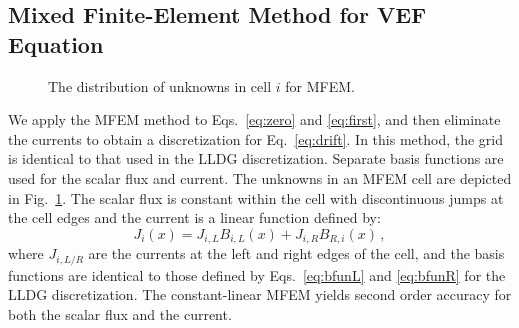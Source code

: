 
\subsection{Mixed Finite-Element Method for VEF Equation}
\begin{figure}
	\centering
	 
	\caption{The distribution of unknowns in cell $i$ for MFEM. }
	\label{fig:mfem_grid}
\end{figure}
We apply the MFEM method to Eqs.~\ref{eq:zero} and \ref{eq:first}, and then eliminate the currents to obtain a discretization for Eq.~\ref{eq:drift}.  In this 
method, the grid is identical to that used in the LLDG \SN discretization.  Separate basis functions are used for the scalar flux and 
current. The unknowns in an MFEM cell are depicted in Fig.~\ref{fig:mfem_grid}. The scalar flux is constant within the cell with discontinuous jumps at the cell edges and the current is a linear function defined by: 
	\begin{equation} \label{eq:MFEM_current}
		J_i(x) = J_{i,L} B_{i,L}(x) + J_{i,R} B_{R,i}(x) \,, 
	\end{equation} 
where $J_{i,L/R}$ are the currents at the left and right edges of the cell, and the basis functions are identical to those 
defined by Eqs.~\ref{eq:bfunL} and \ref{eq:bfunR} for the LLDG \SN discretization.  The constant-linear MFEM yields second 
order accuracy for both the scalar flux and the current.  

